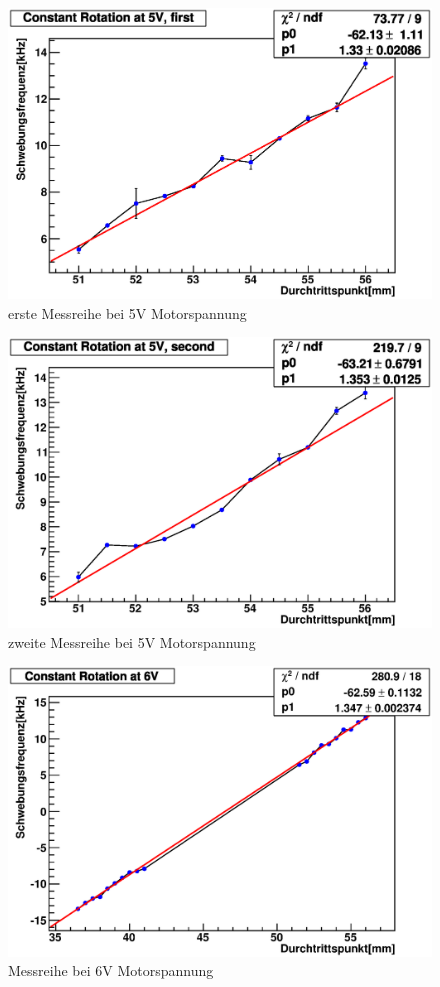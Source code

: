 \documentclass[12pt]{article}
\begin{document}
\begin{figure}[H]  
\centering
\includegraphics[width=0.7\linewidth]{pictures/5V_11.eps}
\caption{erste Messreihe bei 5V Motorspannung}
\end{figure}

\begin{figure}[H]  
\centering
\includegraphics[width=0.7\linewidth]{pictures/5V_21.eps}
\caption{zweite Messreihe bei 5V Motorspannung}
\end{figure}

\begin{figure}[H]  
\centering
\includegraphics[width=0.7\linewidth]{pictures/6V2.eps}
\caption{Messreihe bei 6V Motorspannung}
\end{figure}
\end{document}
